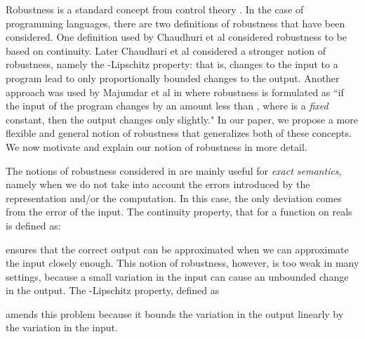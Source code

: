 \documentclass[copyright,creativecommons]{eptcs}
\begin{document}
Robustness is a standard concept from control theory
\cite{pettersson96dc,parsec09}.  In the case of programming languages,
there are two definitions of robustness that have been considered.
One definition used by Chaudhuri et al \cite{chaudhuri10popl}
considered robustness to be based on continuity.  Later Chaudhuri et
al \cite{chaudhuri11sigsoft} considered a stronger notion of
robustness, namely the -Lipschitz property: that is, 
changes to the input to a program lead to only proportionally bounded
changes to the output.
Another approach was used by Majumdar et al in
\cite{majumdar09rtss,majumdar10memocode} where robustness is
formulated as ``if the input of the program changes by an amount less
than , where  is a {\em fixed} constant, then the
output changes only slightly."  In our paper, we propose a more
flexible and general notion of robustness that generalizes both of
these concepts.  We now motivate and explain our notion of robustness
in more detail.

The notions of robustness considered in
\cite{chaudhuri10popl,chaudhuri11sigsoft} are mainly useful for
\emph{exact semantics}, namely when we do not take into account the
errors introduced by the representation and/or the computation. In
this case, the only deviation  comes from the  error of the input. The
continuity property, that for a function  on reals is defined as:  

ensures that the correct output can be approximated when we can
approximate the input closely enough.   This notion of robustness,
however, is too weak in many settings, because a small  variation in
the input can cause an unbounded change in the output. The
-Lipschitz property, defined as

amends this problem because it bounds the variation in the output
linearly by the variation in the input.
\end{document}
